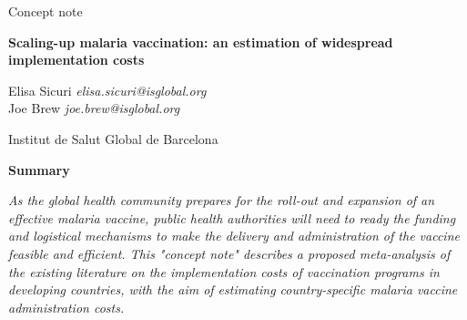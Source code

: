 \documentclass{article}
\begin{document}


\vspace{20mm}


\begin{Large}
\begin{center}
Concept note
\end{center}
\end{Large}


\begin{Large}
\begin{center}
\textbf{Scaling-up malaria vaccination: an estimation of widespread implementation costs} 
\end{center}
\end{Large}


\vspace{5mm}

\begin{changemargin}{2.5cm}{2.5cm} 
\begin{center}
\begin{large}
Elisa Sicuri \hfill \emph{elisa.sicuri@isglobal.org} \\ 
Joe Brew \hfill \emph{joe.brew@isglobal.org} \\
\end{large}
\end{center}
\end{changemargin}


\vspace{6mm}

\begin{center}
\begin{large}
Institut de Salut Global de Barcelona 
\end{large}
\end{center}


\begin{changemargin}{3cm}{3cm} 

\begin{center}
\textbf{Summary}
\end{center}

\emph{As the global health community prepares for the roll-out and expansion of an effective malaria vaccine, public health authorities will need to ready the funding and logistical mechanisms to make the delivery and administration of the vaccine feasible and efficient. This "concept note" describes a proposed meta-analysis of the existing literature on the implementation costs of vaccination programs in developing countries, with the aim of estimating country-specific malaria vaccine administration costs.}
\end{changemargin}
\vfill  
\end{document}
